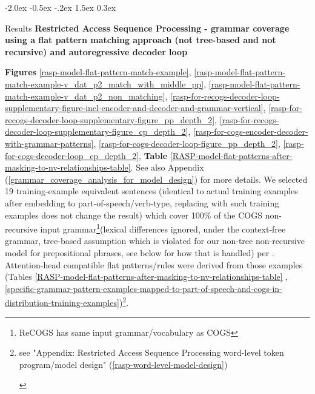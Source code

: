 \documentclass[11pt]{article}
\makeatletter
\renewcommand\section{\@startsection{section}{1}{\z@}%
                                  {-2.0ex \@plus -0.5ex \@minus -.2ex}%
                                  {1.5ex \@plus 0.3ex}%
                                  {\large\bfseries\raggedright}}
\makeatother
\begin{document}
\section{Results}
\textbf{Restricted Access Sequence Processing - grammar coverage using a flat pattern matching approach (not tree-based and not recursive) and autoregressive decoder loop}

\textbf{Figures} \ref{rasp-model-flat-pattern-match-example}, \ref{rasp-model-flat-pattern-match-example-v_dat_p2_match_with_middle_pp}, \ref{rasp-model-flat-pattern-match-example-v_dat_p2_non_matching}, \ref{rasp-for-recogs-decoder-loop-supplementary-figure-incl-encoder-and-decoder-and-grammar-vertical}, \ref{rasp-for-recogs-decoder-loop-supplementary-figure_pp_depth_2}, \ref{rasp-for-recogs-decoder-loop-supplementary-figure_cp_depth_2}, \ref{rasp-for-cogs-encoder-decoder-with-grammar-patterns}, \ref{rasp-for-cogs-decoder-loop-figure_pp_depth_2}, \ref{rasp-for-cogs-decoder-loop_cp_depth_2}, \textbf{Table} \ref{RASP-model-flat-patterns-after-masking-to-nv-relationships-table}. See also Appendix (\ref{grammar_coverage_analysis_for_model_design}) for more details. We selected 19 training-example equivalent sentences (identical to actual training examples after embedding to part-of-speech/verb-type, replacing with such training examples does not change the result) which cover 100\% of the COGS non-recursive input grammar\footnote{ReCOGS has same input grammar/vocabulary as COGS}(lexical differences ignored, under the context-free grammar, tree-based assumption which is violated for our non-tree non-recursive model for prepositional phrases, see below for how that is handled) per \citep{fuzzingbook2023:GrammarCoverageFuzzer}.
Attention-head compatible flat patterns/rules were derived from those examples (Tables \ref{RASP-model-flat-patterns-after-masking-to-nv-relationships-table} , \ref{specific-grammar-pattern-examples-mapped-to-part-of-speech-and-cogs-in-distribution-training-examples})\footnote{\begin{footnotesize}see "Appendix: Restricted Access Sequence Processing word-level token program/model design" (\ref{rasp-word-level-model-design})\end{footnotesize}}.
\end{document}
